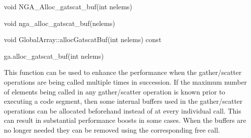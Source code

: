 \documentclass[12pt]{article}
\begin{document}


\begin{capi}
\begin{ccode}
void NGA_Alloc_gatscat_buf(int nelems)
\end{ccode}
\begin{funcargs}
\end{funcargs}
\end{capi}

\begin{fapi}
\begin{fcode}
void nga_alloc_gatscat_buf(nelems)
\end{fcode}
\begin{funcargs}
\end{funcargs}
\end{fapi}

\begin{cxxapi}
\begin{cxxcode}
void GlobalArray::allocGatscatBuf(int nelems) const
\end{cxxcode}
\begin{funcargs}
\end{funcargs}
\end{cxxapi}

\begin{pyapi}
\begin{pycode}
ga.alloc_gatscat_buf(int nelems)
\end{pycode}
\begin{funcargs}
\end{funcargs}
\end{pyapi}

\local

\begin{desc}
This function can be used to enhance the performance when the gather/scatter
operations are being called multiple times in succession. If the maximum number
of elements being called in any gather/scatter operation is known prior to
executing a code segment, then some internal buffers used in the gather/scatter
operations can be allocated beforehand instead of at every individual call. This
can result in substantial performance boosts in some cases. When the buffers are
no longer needed they can be removed using the corresponding free call.
\end{desc}
\end{document}
